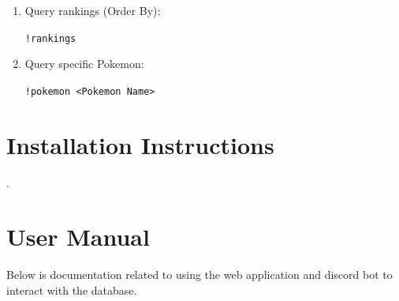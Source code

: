 \documentclass{article}
\begin{document}
\begin{itemize}
\begin{enumerate}
\begin{algorithm}[H]
\begin{algorithmic}
                \EndFunction
            \end{algorithmic}
        \end{algorithm}
        \newpage
        \item Query rankings (Order By):
        \begin{algorithm}[H]
            \verb|!rankings|
            \label{pseudoPSO}
            \begin{algorithmic}
                \EndFunction
            \end{algorithmic}
        \end{algorithm}
        \item Query specific Pokemon:
        \begin{algorithm}[H]
            \verb|!pokemon <Pokemon Name>|
            \label{pseudoPSO}
            \begin{algorithmic}
                \EndIf
                \EndFunction
            \end{algorithmic}
        \end{algorithm}
    \end{enumerate}
\end{itemize}
\newpage
\section*{Installation Instructions}

\newpage
.
\newpage
\section*{User Manual}
Below is documentation related to using the web application and discord bot to interact with the database.
\end{document}
